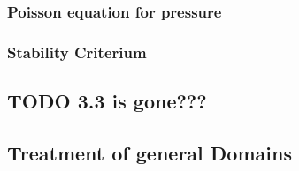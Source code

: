 \subsubsection{Poisson equation for pressure}

\subsubsection{Stability Criterium}



\subsection{TODO 3.3 is gone???}






\subsection{Treatment of general Domains}


